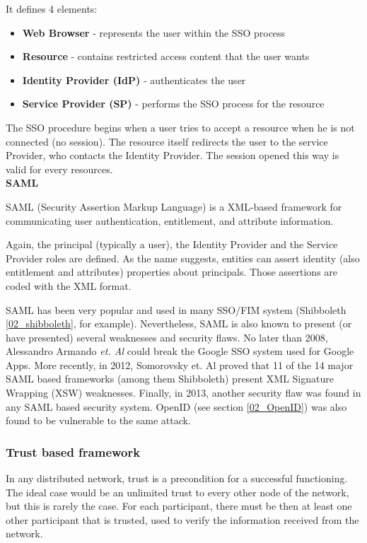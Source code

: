 It defines 4 elements:
\begin{itemize}
	\item \textbf{Web Browser} - represents the user within the SSO process
	\item \textbf{Resource} - contains restricted access content that the user wants
	\item \textbf{Identity Provider (IdP)} - authenticates the user
	\item \textbf{Service Provider (SP)} - performs the SSO process for the resource
\end{itemize} 

The SSO procedure begins when a user tries to accept a resource when he is not connected (no session). The resource itself redirects the user to the service Provider, who contacts the Identity Provider. The session opened this way is valid for every resources.
\\

\quad \tabitem \textbf{SAML}
\label{02_SAML}

SAML (Security Assertion Markup Language)\cite{hughes2005security} is a XML-based framework for communicating user authentication, entitlement, and attribute information.

Again, the principal (typically a user), the Identity Provider and the Service Provider roles are defined. As the name suggests, entities can assert identity (also entitlement and attributes) properties about principals. Those assertions are coded with the XML format.

SAML has been very popular and used in many SSO/FIM system (Shibboleth \ref{02_shibboleth}, for example). Nevertheless, SAML is also known to present (or have presented) several weaknesses and security flaws. No later than 2008, Alessandro Armando \textit{et. Al} could break the Google SSO system used for Google Apps\cite{Armando2008}. More recently, in 2012, Somorovsky et. Al proved that 11 of the 14 major SAML based frameworks (among them Shibboleth) present XML Signature Wrapping (XSW) weaknesses\cite{somorovsky2012breaking}. Finally, in 2013, another security flaw was found in any SAML based security system\cite{armando2013authentication}. OpenID (see section \ref{02_OpenID}) was also found to be vulnerable to the same attack.




\subsubsection{Trust based framework}
In any distributed network, trust is a precondition for a successful functioning. The ideal case would be an unlimited trust to every other node of the network, but this is rarely the case. For each participant, there must be then at least one other participant that is trusted, used to verify the information received from the network.

